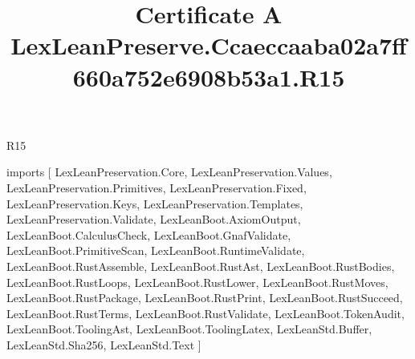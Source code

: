 \begin{lexlean}{R15}
\title{Certificate A LexLeanPreserve.Ccaeccaaba02a7ff660a752e6908b53a1.R15}
\begin{coremodule}
imports [
  LexLeanPreservation.Core,
  LexLeanPreservation.Values,
  LexLeanPreservation.Primitives,
  LexLeanPreservation.Fixed,
  LexLeanPreservation.Keys,
  LexLeanPreservation.Templates,
  LexLeanPreservation.Validate,
  LexLeanBoot.AxiomOutput,
  LexLeanBoot.CalculusCheck,
  LexLeanBoot.GnafValidate,
  LexLeanBoot.PrimitiveScan,
  LexLeanBoot.RuntimeValidate,
  LexLeanBoot.RustAssemble,
  LexLeanBoot.RustAst,
  LexLeanBoot.RustBodies,
  LexLeanBoot.RustLoops,
  LexLeanBoot.RustLower,
  LexLeanBoot.RustMoves,
  LexLeanBoot.RustPackage,
  LexLeanBoot.RustPrint,
  LexLeanBoot.RustSucceed,
  LexLeanBoot.RustTerms,
  LexLeanBoot.RustValidate,
  LexLeanBoot.TokenAudit,
  LexLeanBoot.ToolingAst,
  LexLeanBoot.ToolingLatex,
  LexLeanStd.Buffer,
  LexLeanStd.Sha256,
  LexLeanStd.Text
]


\end{coremodule}
\end{lexlean}
